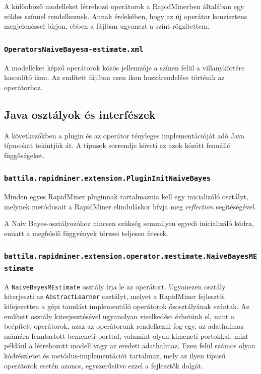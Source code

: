 \documentclass[a4paper]{article}
\begin{document}
A különböző modelleket létrehozó operátorok a RapidMinerben általában egy zöldes színnel rendelkeznek. Annak érdekében, hogy az új operátor konzisztens megjelenéssel bírjon, ebben a fájlban ugyanezt a színt rögzítettem.

\subsubsection{\texttt{OperatorsNaiveBayesm-estimate.xml}}

A modelleket képző operátorok közös jellemzője a színen felül a villanykörtére hasonlító ikon. Az említett fájlban ezen ikon hozzárendelése történik az operátorhoz.

\subsection{Java osztályok és interfészek}

A következőkben a plugin és az operátor tényleges implementációját adó Java típusokat tekintjük át. A típusok sorrendje követi az azok között fennálló függőségeket.

\subsubsection{\texttt{battila.rapidminer.extension.PluginInitNaiveBayes}}

Minden egyes RapidMiner pluginnak tartalmaznia kell egy inicializáló osztályt, melynek metódusait a RapidMiner elinduláskor hívja meg \textit{reflection} segítéségével.

A Naiv Bayes-osztályozóhoz nincsen szükség semmilyen egyedi inicializáló kódra, emiatt a megfelelő függvények törzsei teljesen üresek.

\subsubsection{\texttt{battila.rapidminer.extension.operator.mestimate.NaiveBayesMEstimate}}

A \texttt{NaiveBayesMEstimate} osztály írja le az operátort. Ugyanezen osztály kiterjeszti az \texttt{AbstractLearner} osztályt, melyet a RapidMiner fejlesztői kifejezetten a gépi tanulást implementáló operátorok ősosztályának szántak. Az említett osztály kiterjesztésével ugyanolyan viselkedést érhetünk el, mint a beépített operátorok, azaz az operátorunk rendelkezni fog egy, az adathalmaz számára fenntartott bemeneti porttal, valamint olyan kimeneti portokkal, mint például a létrehozott modell vagy az eredeti adathalmaz. Ezen felül számos olyan kódrészletet és metódus-implementációt tartalmaz, mely az ilyen típusú operátorok esetén azonos, egyszerűsítve ezzel a fejlesztők dolgát.
\end{document}

